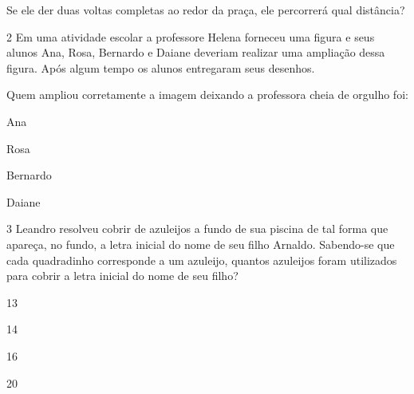 
Se ele der duas voltas completas ao redor da praça, ele percorrerá qual
distância?



\num{2} Em uma atividade escolar a professore Helena forneceu uma figura e
seus alunos Ana, Rosa, Bernardo e Daiane deveriam realizar uma ampliação
dessa figura. Após algum tempo os alunos entregaram seus desenhos.


Quem ampliou corretamente a imagem deixando a professora cheia de
orgulho foi:

\begin{escolha}
\item
  Ana
\item
  Rosa
\item
  Bernardo
\item
  Daiane
\end{escolha}


\num{3} Leandro resolveu cobrir de azuleijos a fundo de sua piscina de tal
forma que apareça, no fundo, a letra inicial do nome de seu filho
Arnaldo. Sabendo-se que cada quadradinho corresponde a um azuleijo,
quantos azuleijos foram utilizados para cobrir a letra inicial do nome
de seu filho?


\begin{escolha}
\item
  13
\item
  14
\item
  16
\item
  20
\end{escolha}

